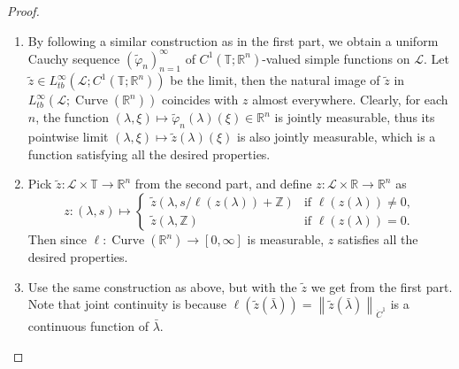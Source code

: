 \documentclass[reqno,centertags,12pt]{amsart}
\theoremstyle{definition}
\numberwithin{equation}{section}
\newcommand{\norm}[1]{\left\|#1\right\|}
\newcommand{\seq}[1]{\left( #1 \right)}
\newcommand{\bbR}{{\mathbb{R}}}
\newcommand{\bbZ}{{\mathbb{Z}}}
\newcommand{\bbT}{{\mathbb{T}}}
\begin{document}
\begin{proof}
\begin{enumerate}
        \item By following a similar construction as in the first part,
        we obtain a uniform Cauchy sequence $\seq{\tilde{\varphi}_{n}}_{n=1}^{\infty}$
        of $C^{1}(\bbT;\bbR^{n})$-valued simple functions on $\mathcal{L}$.
        Let $\tilde{z}\in L_{tb}^{\infty}(\mathcal{L};C^{1}(\bbT;\bbR^{n}))$ be the limit,
        then the natural image of $\tilde{z}$ in
        $L_{tb}^{\infty}(\mathcal{L};\operatorname{Curve}(\bbR^{n}))$
        coincides with $z$ almost everywhere. Clearly, for each $n$, the function
        $(\lambda,\xi)\mapsto\tilde{\varphi}_{n}(\lambda)(\xi)\in\bbR^{n}$ is jointly measurable,
        thus its pointwise limit $(\lambda,\xi)\mapsto \tilde{z}(\lambda)(\xi)$ is
        also jointly measurable, which is a function satisfying all the desired
        properties. \\

        \item Pick $\tilde{z}\colon\mathcal{L}\times\bbT\to\bbR^{n}$ from the second part,
        and define $z\colon\mathcal{L}\times\bbR\to\bbR^{n}$ as
        \[
            z\colon(\lambda,s)\mapsto
            \begin{cases}
                \tilde{z}(\lambda,s/\ell(z(\lambda)) + \bbZ)
                &\textrm{if $\ell(z(\lambda)) \neq 0$}, \\
                \tilde{z}(\lambda,\bbZ)
                &\textrm{if $\ell(z(\lambda)) = 0$.}
            \end{cases}
        \]
        Then since $\ell\colon\operatorname{Curve}(\bbR^{n})\to[0,\infty]$
        is measurable, $z$ satisfies all the desired properties. \\

        \item Use the same construction as above, but with
        the $\tilde{z}$ we get from the first part.
        Note that joint continuity is because
        $\ell(\tilde{z}(\bar{\lambda})) = \norm{\tilde{z}(\bar{\lambda})}_{\dot{C}^{1}}$
        is a continuous function of $\bar{\lambda}$.
    \end{enumerate}
\end{proof}
\end{document}
